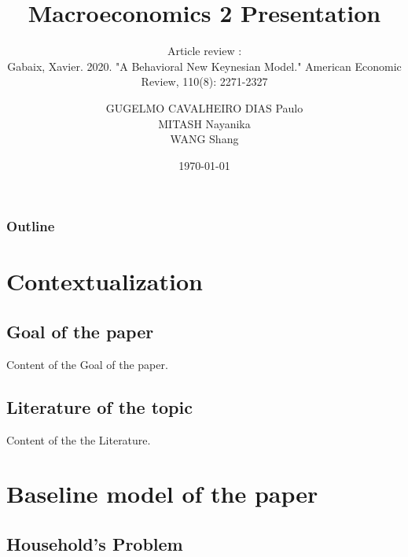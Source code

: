 \documentclass{beamer}
\title{Macroeconomics 2 Presentation}
\subtitle{Article review :\\ Gabaix, Xavier. 2020. "A Behavioral New Keynesian Model." American Economic Review, 110(8): 2271-2327}
\author{GUGELMO CAVALHEIRO DIAS Paulo \\ MITASH Nayanika \\ WANG Shang}
\institute{Sciences Po}
\date{\today}
\newcommand\ReduceFont{\fontsize{10}{7.2}\selectfont}
\begin{document}
\begin{frame}
    \titlepage
\end{frame}

\begin{frame}
    \ReduceFont
    \frametitle{Outline}
    \tableofcontents[hideallsubsections]
\end{frame}

\section{Contextualization}
\begin{frame}
    \tableofcontents[currentsection, hideothersubsections, sections=\value{section}]
\end{frame}

\subsection{Goal of the paper}
\begin{frame}{\subsecname}
    Content of the Goal of the paper.
\end{frame}

\subsection{Literature of the topic}
\begin{frame}
    Content of the the Literature.
\end{frame}

\section{Baseline model of the paper}
\begin{frame}
    \ReduceFont
\end{frame}

\begin{frame}
    \tableofcontents[currentsection, hideothersubsections, sections=\value{section}]
\end{frame}

\subsection{Household's Problem}
\end{document}
